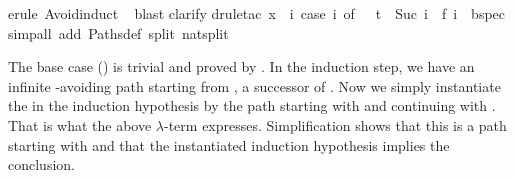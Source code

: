 \begin{isabellebody}
%
\isadelimproof
%
\endisadelimproof
%
\isatagproof
{}\isamarkupfalse%
{\isacharparenleft}erule\ Avoid{\isachardot}induct{\isacharparenright}\isanewline
\ \isamarkupfalse%
{\isacharparenleft}blast{\isacharparenright}\isanewline
{}\isamarkupfalse%
{\isacharparenleft}clarify{\isacharparenright}\isanewline
{}\isamarkupfalse%
{\isacharparenleft}drule{\isacharunderscore}tac\ x\ {\isacharequal}\ {\isachardoublequoteopen}{\isasymlambda}i{\isachardot}\ case\ i\ of\ {}\ {\isasymRightarrow}\ t\ {\isacharbar}\ Suc\ i\ {\isasymRightarrow}\ f\ i{\isachardoublequoteclose}\ \ bspec{\isacharparenright}\isanewline
{}\isamarkupfalse%
{\isacharparenleft}simp{\isacharunderscore}all\ add{\isacharcolon}\ Paths{\isacharunderscore}def\ split{\isacharcolon}\ nat{\isachardot}split{\isacharparenright}\isanewline
{}\isamarkupfalse%
%
\endisatagproof
{\isafoldproof}%
%
\isadelimproof
%
\endisadelimproof
%
\begin{isamarkuptext}%
\noindent
The base case () is trivial and proved by .
In the induction step, we have an infinite -avoiding path 
starting from , a successor of . Now we simply instantiate
the  in the induction hypothesis by the path starting with
 and continuing with . That is what the above $\lambda$-term
expresses.  Simplification shows that this is a path starting with  
and that the instantiated induction hypothesis implies the conclusion.


\end{isamarkuptext}
\end{isabellebody}
